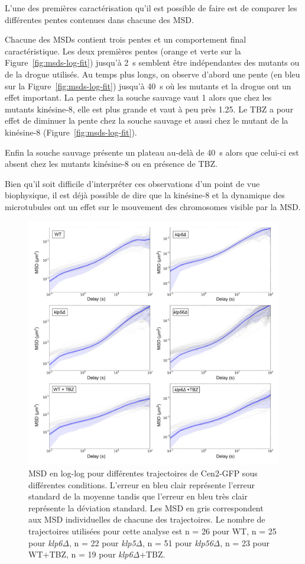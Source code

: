 \documentclass[12pt,a4paper,twoside,openright]{book}
\begin{document}
L'une des premières caractérisation qu'il est possible de faire est de
comparer les différentes pentes contenues dans chacune des MSD.

Chacune des MSDs contient trois pentes et un comportement final
caractéristique. Les deux premières pentes (orange et verte sur la
Figure~\ref{fig:msds-log-fit}) jusqu'à 2~s semblent être indépendantes
des mutants ou de la drogue utilisés. Au temps plus longs, on observe
d'abord une pente (en bleu sur la Figure~\ref{fig:msds-log-fit}) jusqu'à
40~s où les mutants et la drogue ont un effet important. La pente chez
la souche sauvage vaut 1 alors que chez les mutants kinésine-8, elle est
plus grande et vaut à peu près 1.25. Le TBZ a pour effet de diminuer la
pente chez la souche sauvage et aussi chez le mutant de la kinésine-8
(Figure~\ref{fig:msds-log-fit}).

Enfin la souche sauvage présente un plateau au-delà de 40~s alors que
celui-ci est absent chez les mutants kinésine-8 ou en présence de TBZ.

Bien qu'il soit difficile d'interpréter ces observations d'un point de
vue biophysique, il est déjà possible de dire que la kinésine-8 et la
dynamique des microtubules ont un effet sur le mouvement des chromosomes
visible par la MSD.

\begin{figure}[htbp]
\centering
\includegraphics{figures/results/imaging/msds_log.png}
\caption[MSD en log-log pour différentes trajectoires de Cen2-GFP sous différentes conditions]{\label{fig:msds-log}MSD
en log-log pour différentes trajectoires de Cen2-GFP sous différentes
conditions. L'erreur en bleu clair représente l'erreur standard de la
moyenne tandis que l'erreur en bleu très clair représente la déviation
standard. Les MSD en gris correspondent aux MSD individuelles de chacune
des trajectoires. Le nombre de trajectoires utilisées pour cette analyse
est n = 26 pour WT, n = 25 pour \emph{klp6Δ}, n = 22 pour \emph{klp5Δ},
n = 51 pour \emph{klp56Δ}, n = 23 pour WT+TBZ, n = 19 pour
\emph{klp6Δ}+TBZ.}
\end{figure}
\end{document}
